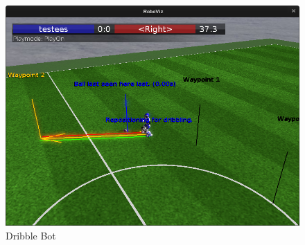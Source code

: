 \begin{figure}[H]
	\centering
	\includegraphics[width=\ScaleIfNeeded]{Grafiken/Dribble/DribbleRektReposition}
	\caption{Dribble Bot}
	\label{fig:dribblerekt}
\end{figure}
